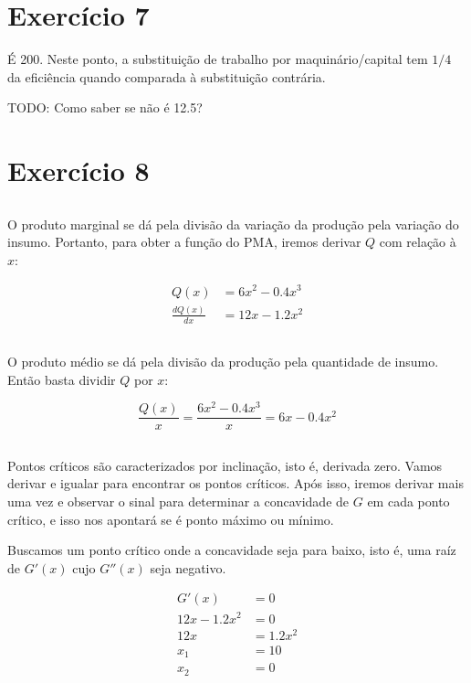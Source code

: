 \documentclass{article}
\begin{document}
\section{Exercício 7}

É 200. Neste ponto, a substituição de trabalho por maquinário/capital tem
\(1/4\) da eficiência quando comparada à substituição contrária.

TODO: Como saber se não é 12.5?

\section{Exercício 8}
\subsection{}

O produto marginal se dá pela divisão da variação da produção pela variação do
insumo. Portanto, para obter a função do PMA, iremos derivar \(Q\) com relação
à \(x\):

\[
	\begin{aligned}
		Q(x)             & = 6x^2 - 0.4x^3 \\
		\frac{dQ(x)}{dx} & = 12x - 1.2x^2
	\end{aligned}
\]

\subsection{}

O produto médio se dá pela divisão da produção pela quantidade de insumo. Então basta dividir \(Q\) por \(x\):

\[
	\frac{Q(x)}{x} = \frac{6x^2 - 0.4x^3}{x} = 6x - 0.4x^2
\]

\subsection{}

Pontos críticos são caracterizados por inclinação, isto é, derivada zero. Vamos
derivar e igualar para encontrar os pontos críticos. Após isso, iremos derivar
mais uma vez e observar o sinal para determinar a concavidade de \(G\) em cada
ponto crítico, e isso nos apontará se é ponto máximo ou mínimo.

Buscamos um ponto crítico onde a concavidade seja para baixo, isto é, uma raíz
de \(G'(x)\) cujo \(G''(x)\) seja negativo.

\[
	\begin{aligned}
		G'(x)        & = 0      \\
		12x - 1.2x^2 & = 0      \\
		12x          & = 1.2x^2 \\
		x_1          & = 10     \\
		x_2          & = 0
	\end{aligned}
\]
\end{document}
